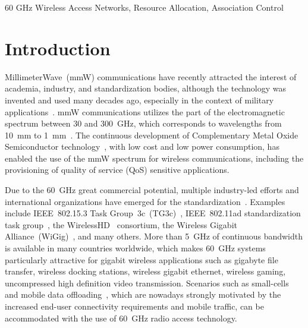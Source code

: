 \documentclass[journal, 10pt, twocolumn]{IEEEtran}
\begin{document}
\begin{keywords}
60 GHz Wireless Access Networks, Resource Allocation, Association Control
\end{keywords}



\section{Introduction}\label{sec:Introduction}



MillimeterWave~(mmW) communications have recently attracted the interest of academia, industry, and standardization bodies, although the technology was invented and used many decades ago, especially in the context of military applications~\cite{Giannetti99,Smulders07}. mmW communications utilizes the part of the electromagnetic spectrum between 30 and 300~GHz, which corresponds to wavelengths from 10~mm to 1~mm~\cite{Oliver89}. The continuous development of Complementary Metal Oxide Semiconductor technology~\cite{Doan04}, with low cost and low power consumption, has enabled the use of the mmW spectrum for wireless communications, including the provisioning of quality of service (QoS) sensitive applications. 

Due to the 60~GHz great commercial potential, multiple industry-led efforts and international organizations have emerged for the standardization~\cite{IBM60}.
Examples include IEEE~802.15.3 Task Group~3c~(TG3c)~\cite{802_15_3c}, IEEE~802.11ad standardization task group~\cite{802_11ad}, the WirelessHD~\cite{WirelessHD} consortium, the Wireless Gigabit Alliance~(WiGig)~\cite{WirelessG}, and many others.
More than 5~GHz of continuous bandwidth is available in many countries worldwide, which makes 60~GHz systems particularly attractive for gigabit wireless applications such as gigabyte file transfer, wireless docking stations, wireless gigabit ethernet, wireless gaming, uncompressed high definition video transmission. Scenarios such as small-cells~\cite{Hoydis11} and mobile data offloading~\cite{Lee12}, which are nowadays strongly motivated by the increased end-user connectivity requirements and mobile traffic, can be accommodated with the use of 60~GHz radio access technology. 
\end{document}
